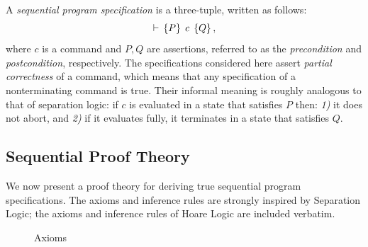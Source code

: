 \documentclass[11pt]{report}
\begin{document}
A \emph{sequential program specification} is a three-tuple, written as follows: \[ \vdash\,\left\lbrace P \right\rbrace\;c\;\left\lbrace Q \right\rbrace, \] where $c$ is a command and $P,Q$ are assertions, referred to as the \emph{precondition} and \emph{postcondition}, respectively. The specifications considered here assert \emph{partial correctness} of a command, which means that any specification of a nonterminating command is true. Their informal meaning is roughly analogous to that of separation logic: if $c$ is evaluated in a state that satisfies $P$ then: \emph{1)} it does not abort, and \emph{2)} if it evaluates fully, it terminates in a state that satisfies $Q$. 

\subsection{Sequential Proof Theory}
\label{sec:sequential-proof-theory}

We now present a proof theory for deriving true sequential program specifications. The axioms and inference rules are strongly inspired by Separation Logic; the axioms and inference rules of Hoare Logic are included verbatim. 

\begin{figure}[ht]
    \centering
    \caption{\label{fig:sequential-axioms}Axioms}
\end{figure}
\end{document}
